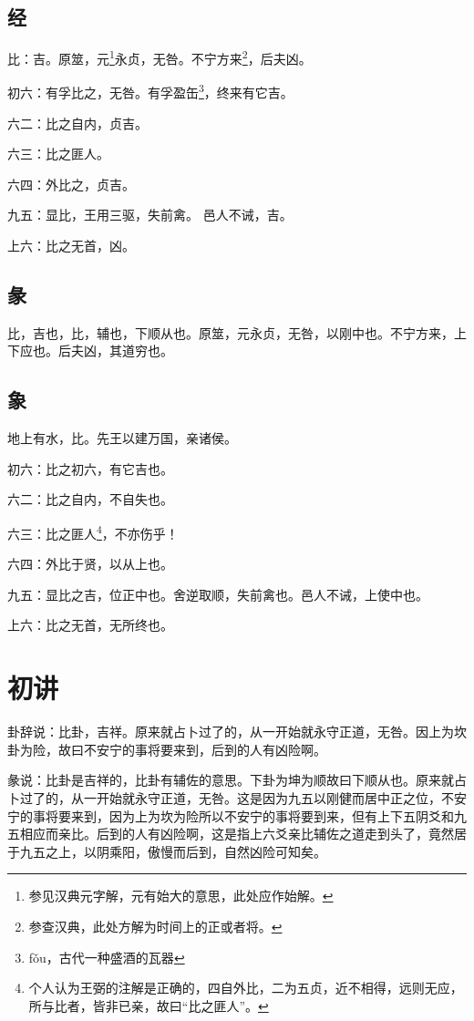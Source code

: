 \documentclass[12pt,oneside]{book}
\begin{document}
\subsection{经}
比：吉。原筮，元\footnote{参见汉典元字解，元有始大的意思，此处应作始解。}永贞，无咎。不宁方来\footnote{参查汉典，此处方解为时间上的正或者将。}，后夫凶。

初六：有孚比之，无咎。有孚盈缶\footnote{fǒu，古代一种盛酒的瓦器}，终来有它吉。

六二：比之自内，贞吉。

六三：比之匪人。

六四：外比之，贞吉。

九五：显比，王用三驱，失前禽。 邑人不诫，吉。

上六：比之无首，凶。

\subsection{彖}
比，吉也，比，辅也，下顺从也。原筮，元永贞，无咎，以刚中也。不宁方来，上下应也。后夫凶，其道穷也。

\subsection{象}
地上有水，比。先王以建万国，亲诸侯。

初六：比之初六，有它吉也。

六二：比之自内，不自失也。

六三：比之匪人\footnote{个人认为王弼的注解是正确的，四自外比，二为五贞，近不相得，远则无应，所与比者，皆非已亲，故曰“比之匪人”。}，不亦伤乎！

六四：外比于贤，以从上也。

九五：显比之吉，位正中也。舍逆取顺，失前禽也。邑人不诫，上使中也。

上六：比之无首，无所终也。

\section{初讲}
卦辞说：比卦，吉祥。原来就占卜过了的，从一开始就永守正道，无咎。因上为坎卦为险，故曰不安宁的事将要来到，后到的人有凶险啊。

彖说：比卦是吉祥的，比卦有辅佐的意思。下卦为坤为顺故曰下顺从也。原来就占卜过了的，从一开始就永守正道，无咎。这是因为九五以刚健而居中正之位，不安宁的事将要来到，因为上为坎为险所以不安宁的事将要到来，但有上下五阴爻和九五相应而亲比。后到的人有凶险啊，这是指上六爻亲比辅佐之道走到头了，竟然居于九五之上，以阴乘阳，傲慢而后到，自然凶险可知矣。
\end{document}
